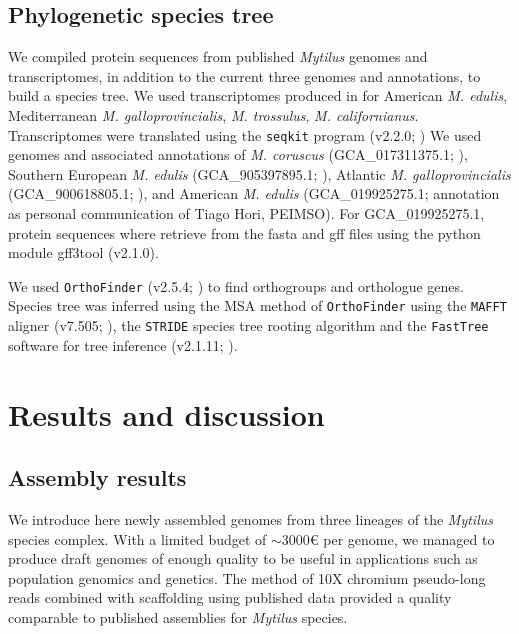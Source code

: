 \documentclass[11pt, a4paper]{article}
\begin{document}
\subsection{Phylogenetic species tree}

We compiled protein sequences from published \textit{Mytilus} genomes and transcriptomes,
in addition to the current three genomes and annotations, to build a species tree.
We used transcriptomes produced in \textcite{Popovic2020a} for American \textit{M. edulis}, 
Mediterranean \textit{M. galloprovincialis}, \textit{M. trossulus}, \textit{M. californianus}.
Transcriptomes were translated using the \texttt{seqkit} program (v2.2.0; \cite{Shen2016})
We used genomes and associated annotations of \textit{M. coruscus} (GCA\_017311375.1; \textcite{Yang2021}),
Southern European \textit{M. edulis} (GCA\_905397895.1; \textcite{Corrochano-Fraile2021}),
Atlantic \textit{M. galloprovincialis} (GCA\_900618805.1; \textcite{Gerdol2020}),
and American \textit{M. edulis} (GCA\_019925275.1; annotation as personal communication of Tiago Hori, PEIMSO).
For GCA\_019925275.1, protein sequences where retrieve from the fasta and gff files using the python module gff3tool (v2.1.0).

We used \texttt{OrthoFinder} (v2.5.4; \cite{Emms2015, Emms2019}) to find orthogroups and orthologue genes.
Species tree was inferred using the MSA method of \texttt{OrthoFinder} \parencite{Emms2018} using the \texttt{MAFFT} aligner (v7.505; \cite{Katoh2013}), the \texttt{STRIDE} species tree rooting algorithm \parencite{Emms2017} and the \texttt{FastTree} software for tree inference (v2.1.11; \cite{Price2009}).


\section{Results and discussion}


\subsection{Assembly results}

We introduce here newly assembled genomes from three lineages of the \textit{Mytilus} species complex.
With a limited budget of $\sim3000$€ per genome, we managed to produce draft genomes of enough quality to be useful
in applications such as population genomics and genetics.
The method of 10X chromium pseudo-long reads combined with scaffolding using published data provided a quality comparable to published assemblies for \textit{Mytilus} species.
\end{document}
